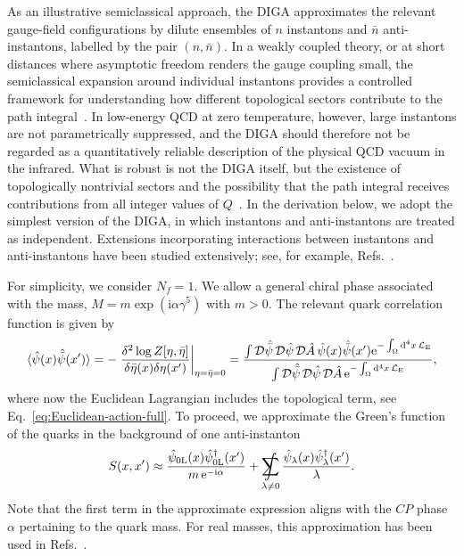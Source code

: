 \documentclass[review]{elsarticle}
\numberwithin{equation}{section}
\numberwithin{table}{section}
\numberwithin{figure}{section}
\DeclareMathOperator*{\SumInt}{%
\mathchoice%
  {\ooalign{$\displaystyle\sum$\cr\hidewidth$\displaystyle\int$\hidewidth\cr}}
  {\ooalign{\raisebox{.14\height}{\scalebox{.7}{$\textstyle\sum$}}\cr\hidewidth$\textstyle\int$\hidewidth\cr}}
  {\ooalign{\raisebox{.2\height}{\scalebox{.6}{$\scriptstyle\sum$}}\cr$\scriptstyle\int$\cr}}
  {\ooalign{\raisebox{.2\height}{\scalebox{.6}{$\scriptstyle\sum$}}\cr$\scriptstyle\int$\cr}}
}
\def\d{\mathrm{d}}
\def\L{\mathcal{L}}
\def\i{\mathrm{i}}
\begin{document}
As an illustrative semiclassical approach, the DIGA approximates the relevant gauge-field configurations by dilute ensembles of $n$ instantons and $\bar n$ anti-instantons, labelled by the pair $(n,\bar n)$. In a weakly coupled theory, or at short distances where asymptotic freedom renders the gauge coupling small, the semiclassical expansion around individual instantons provides a controlled framework for understanding how different topological sectors contribute to the path integral~\cite{tHooft:1976snw,Vainshtein:1981wh}. In low-energy QCD at zero temperature, however, large instantons are not parametrically suppressed, and the DIGA should therefore not be regarded as a quantitatively reliable description of the physical QCD vacuum in the infrared. What is robust is not the DIGA itself, but the existence of topologically nontrivial sectors and the possibility that the path integral receives contributions from all integer values of $Q$~\cite{Callan:1976je,Bonanno:2025wcv,Bonanno:2026zzf}. In the derivation below, we adopt the simplest version of the DIGA, in which instantons and anti-instantons are treated as independent. Extensions incorporating interactions between instantons and anti-instantons have been studied extensively; see, for example, Refs.~\cite{Schafer:1996wv,Diakonov:2002fq}.

For simplicity, we consider $N_f=1$. We allow a general chiral phase associated with the mass, $M= m \exp(\i\alpha\gamma^5)$ with $m>0$. The relevant quark correlation function is given by
\begin{align}
    \langle\hat\psi(x)\hat{\bar\psi}(x^\prime)\rangle 
    =
    -\left.\frac{\delta^2 \log Z[\eta,\bar{\eta}]}{\delta \bar \eta(x) \delta \eta(x^\prime)}\right|_{\eta=\bar{\eta}=0}
    =
    \frac{\int{\cal D}\hat{\bar\psi}\,{\cal D}\hat\psi\,{\cal D}\hat{A}\,\hat{\psi}(x)\hat{\bar\psi}(x^\prime) {\rm e}^{-\int_\Omega \d^4x\,\L_{\rm E}}}{\int{\cal D}\hat{\bar\psi}\,{\cal D}\hat{\psi}\,{\cal D}\hat{A}\, {\rm e}^{-\int_\Omega \d^4x\,\L_{\rm E}}}, 
    \label{quark:correlation}
\end{align}
where now the Euclidean Lagrangian includes the topological term, see Eq.~\eqref{eq:Euclidean-action-full}.
To proceed, we approximate the Green's function of the quarks in the background of one anti-instanton
\begin{align}
    S(x,x^\prime) \approx \frac{\hat\psi_{0\rm L}(x)\hat\psi_{0{\rm L}}^{\dagger}(x^{\prime})}{m\, {\rm e}^{-{\rm i}\alpha}}+\SumInt\limits_{\lambda\not=0} \frac{\hat\psi_\lambda(x)\hat\psi^{\dagger}_\lambda(x^{\prime})}{\lambda}.
\end{align}
Note that the first term in the approximate expression aligns with the $CP$ phase $\alpha$ pertaining to the quark mass. For real masses, this approximation has been used in Refs.~\cite{Shifman:1979uw,Diakonov:1985eg}.
\end{document}
